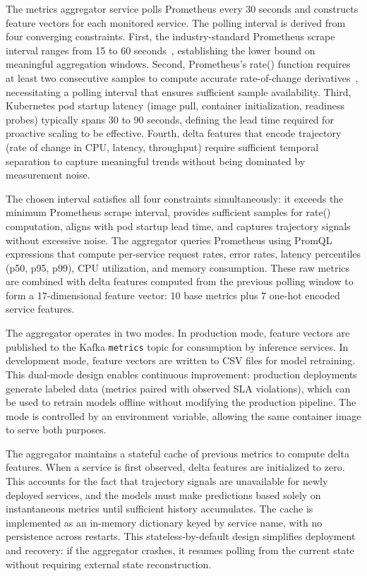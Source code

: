 \documentclass[conference]{IEEEtran}
\begin{document}
The metrics aggregator service polls Prometheus every 30 seconds and constructs feature vectors for each monitored service. The polling interval is derived from four converging constraints. First, the industry-standard Prometheus scrape interval ranges from 15 to 60 seconds~\cite{prometheus}, establishing the lower bound on meaningful aggregation windows. Second, Prometheus's rate() function requires at least two consecutive samples to compute accurate rate-of-change derivatives~\cite{prometheus}, necessitating a polling interval that ensures sufficient sample availability. Third, Kubernetes pod startup latency (image pull, container initialization, readiness probes) typically spans 30 to 90 seconds, defining the lead time required for proactive scaling to be effective. Fourth, delta features that encode trajectory (rate of change in CPU, latency, throughput) require sufficient temporal separation to capture meaningful trends without being dominated by measurement noise.


The chosen interval satisfies all four constraints simultaneously: it exceeds the minimum Prometheus scrape interval, provides sufficient samples for rate() computation, aligns with pod startup lead time, and captures trajectory signals without excessive noise. The aggregator queries Prometheus using PromQL expressions that compute per-service request rates, error rates, latency percentiles (p50, p95, p99), CPU utilization, and memory consumption. These raw metrics are combined with delta features computed from the previous polling window to form a 17-dimensional feature vector: 10 base metrics plus 7 one-hot encoded service features.

The aggregator operates in two modes. In production mode, feature vectors are published to the Kafka \texttt{metrics} topic for consumption by inference services. In development mode, feature vectors are written to CSV files for model retraining. This dual-mode design enables continuous improvement: production deployments generate labeled data (metrics paired with observed SLA violations), which can be used to retrain models offline without modifying the production pipeline. The mode is controlled by an environment variable, allowing the same container image to serve both purposes.

The aggregator maintains a stateful cache of previous metrics to compute delta features. When a service is first observed, delta features are initialized to zero. This accounts for the fact that trajectory signals are unavailable for newly deployed services, and the models must make predictions based solely on instantaneous metrics until sufficient history accumulates. The cache is implemented as an in-memory dictionary keyed by service name, with no persistence across restarts. This stateless-by-default design simplifies deployment and recovery: if the aggregator crashes, it resumes polling from the current state without requiring external state reconstruction.
\end{document}
